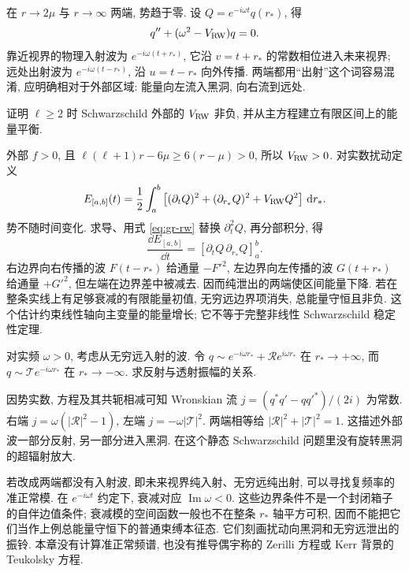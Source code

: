 在 $r\to2\mu$ 与 $r\to\infty$ 两端, 势趋于零. 设 $Q=e^{-i\omega t}q(r_*)$, 得
\begin{equation}
 q''+(\omega^2-V_{\rm RW})q=0.
 \label{eq:gr-rw-radial}
\end{equation}
靠近视界的物理入射波为 $e^{-i\omega(t+r_*)}$, 它沿 $v=t+r_*$ 的常数相位进入未来视界; 远处出射波为 $e^{-i\omega(t-r_*)}$, 沿 $u=t-r_*$ 向外传播. 两端都用“出射”这个词容易混淆, 应明确相对于外部区域: 能量向左流入黑洞, 向右流到远处.

\begin{example}
 证明 $\ell\ge2$ 时 Schwarzschild 外部的 $V_{\rm RW}$ 非负, 并从主方程建立有限区间上的能量平衡.
\end{example}
\begin{solution}
 外部 $f>0$, 且 $\ell(\ell+1)r-6\mu\ge6(r-\mu)>0$, 所以 $V_{\rm RW}>0$. 对实数扰动定义
 \[
 E_{[a,b]}(t)=\frac12\int_a^b\left[(\partial_tQ)^2
          +(\partial_{r_*}Q)^2+V_{\rm RW}Q^2\right]\,\mathrm d r_*.
 \]
 势不随时间变化. 求导、用式 \eqref{eq:gr-rw} 替换 $\partial_t^2Q$, 再分部积分, 得
 \[
 \frac{\dd E_{[a,b]}}{\dd t}
       =[\partial_tQ\,\partial_{r_*}Q]_a^b.
 \]
 右边界向右传播的波 $F(t-r_*)$ 给通量 $-F'^2$, 左边界向左传播的波 $G(t+r_*)$ 给通量 $+G'^2$, 但左端在边界差中被减去. 因而纯泄出的两端使区间能量下降. 若在整条实线上有足够衰减的有限能量初值, 无穷远边界项消失, 总能量守恒且非负. 这个估计约束线性轴向主变量的能量增长; 它不等于完整非线性 Schwarzschild 稳定性定理.
\end{solution}

\begin{example}
 对实频 $\omega>0$, 考虑从无穷远入射的波. 令
 $q\sim e^{-i\omega r_*}+\mathcal R e^{i\omega r_*}$ 在 $r_*\to+\infty$, 而
 $q\sim\mathcal T e^{-i\omega r_*}$ 在 $r_*\to-\infty$. 求反射与透射振幅的关系.
\end{example}
\begin{solution}
 因势实数, 方程及其共轭相减可知 Wronskian 流
 $j=(q^*q'-qq'^*)/(2i)$ 为常数. 右端 $j=\omega(|\mathcal R|^2-1)$, 左端 $j=-\omega|\mathcal T|^2$. 两端相等给 $|\mathcal R|^2+|\mathcal T|^2=1$. 这描述外部波一部分反射, 另一部分进入黑洞. 在这个静态 Schwarzschild 问题里没有旋转黑洞的超辐射放大.
\end{solution}

若改成两端都没有入射波, 即未来视界纯入射、无穷远纯出射, 可以寻找复频率的准正常模. 在 $e^{-i\omega t}$ 约定下, 衰减对应 $\operatorname{Im}\omega<0$. 这些边界条件不是一个封闭箱子的自伴边值条件; 衰减模的空间函数一般也不在整条 $r_*$ 轴平方可积, 因而不能把它们当作上例总能量守恒下的普通束缚本征态. 它们刻画扰动向黑洞和无穷远泄出的振铃. 本章没有计算准正常频谱, 也没有推导偶宇称的 Zerilli 方程或 Kerr 背景的 Teukolsky 方程.

